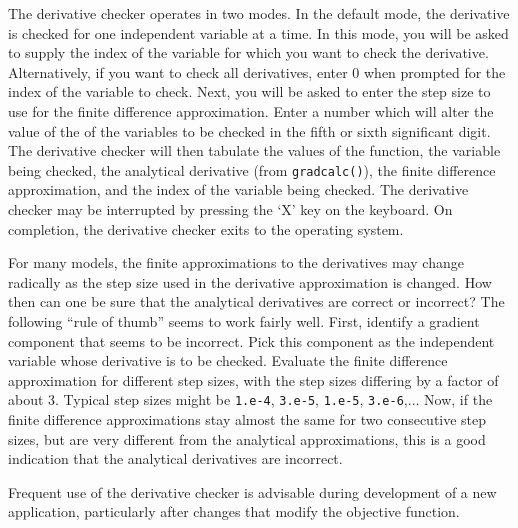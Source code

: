 \documentclass{admbmanual}
\begin{document}
The derivative checker operates in two modes. In the default mode, the
derivative is checked for one independent variable at a time. In this mode, you
will be asked to supply the index of the variable for which you want to check
the derivative. Alternatively, if you want to check all derivatives, enter $0$
when prompted for the index of the variable to check. Next, you will be asked to
enter the step size to use for the finite difference approximation. Enter a
number which will alter the value of the of the variables to be checked in the
fifth or sixth significant digit. The derivative checker will then tabulate the
values of the function, the variable being checked, the analytical derivative
(from \texttt{gradcalc()}), the finite difference approximation, and the index
of the variable being checked. The derivative checker may be interrupted by
pressing the `X' key on the keyboard. On completion, the derivative checker
exits to the operating system.

For many models, the finite approximations to the derivatives may change
radically as the step size used in the derivative approximation is changed. How
then can one be sure that the analytical derivatives are correct or incorrect?
The following ``rule of thumb'' seems to work fairly well. First, identify a
gradient component that seems to be incorrect. Pick this component as the
independent variable whose derivative is to be checked. Evaluate the finite
difference approximation for different step sizes, with the step sizes differing
by a factor of about 3. Typical step sizes might be \texttt{1.e-4},
\texttt{3.e-5}, \texttt{1.e-5}, \texttt{3.e-6},$\ldots$ Now, if the finite
difference approximations stay almost the same for two consecutive step sizes,
but are very different from the analytical approximations, this is a good
indication that the analytical derivatives are incorrect.

Frequent use of the derivative checker is advisable during development of a new
application, particularly after changes that modify the objective function.
\end{document}
